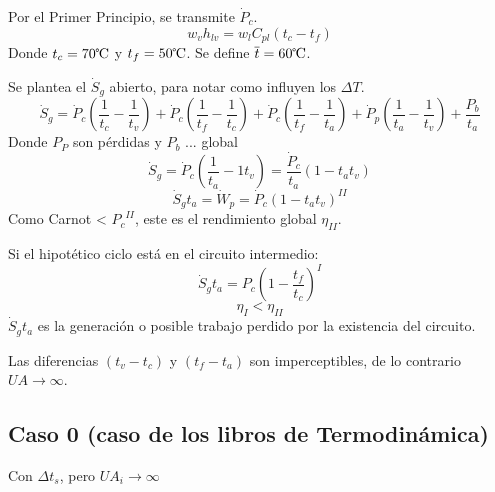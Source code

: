\documentclass{article}
\begin{document}
Por el Primer Principio, se transmite $\dot{P}_c$.
\begin{equation}
    w_vh_{lv}=w_lC_{pl}\left(t_c-t_f\right)
\end{equation}
Donde $t_c=70\celsius$ y $t_f=50\celsius$. Se define $\overline{t}=60\celsius$.

Se plantea el $\dot{S}_g$ abierto, para notar como influyen los $\Delta{T}$.
\begin{equation}
    \dot{S}_g=\dot{P}_c\left(\frac{1}{t_c}-\frac{1}{t_v}\right)+\dot{P}_c\left(\frac{1}{t_f}-\frac{1}{t_c}\right)+\dot{P}_c\left(\frac{1}{t_f}-\frac{1}{t_a}\right)+\dot{P}_p\left(\frac{1}{t_a}-\frac{1}{t_v}\right)+\frac{P_b}{t_a}
\end{equation}
Donde $P_P$ son pérdidas y $P_b$ ... global
\begin{equation}
    \dot{S}_g=\dot{P}_c\left(\frac{1}{t_a}-{1}{t_v}\right)=\frac{\dot{P}_c}{t_a}\left(1-{t_a}{t_v}\right)
\end{equation}
\begin{equation}
    \dot{S}_gt_a=\dot{W}_p=\dot{P}_c\left(1-{t_a}{t_v}\right)^{II}
\end{equation}
Como Carnot < ${P_c}^{II}$, este es el rendimiento global $\eta_{II}$.

Si el hipotético ciclo está en el circuito intermedio:
\begin{equation}
    \dot{S}_gt_a=P_c\left(1-\frac{t_f}{t_c}\right)^{I}
\end{equation}
\begin{equation}
    \eta_I<\eta_{II}
\end{equation}
$\dot{S}_gt_a$ es la generación o posible trabajo perdido por la existencia del circuito.

Las diferencias $\left(t_v-t_c\right)$ y $\left(t_f-t_a\right)$ son imperceptibles, de lo contrario $UA\xrightarrow{}\infty$.
\subsection{Caso 0 (caso de los libros de Termodinámica)}
Con $\Delta{t_s}$, pero $UA_i\xrightarrow{}\infty$
\end{document}
